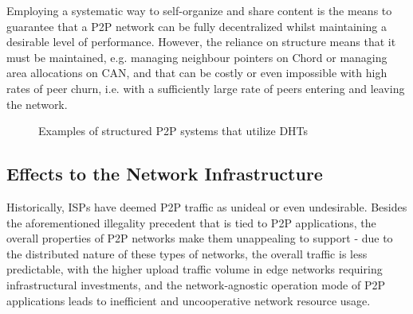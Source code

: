 \documentclass[
  oneside,
  11pt, a4paper,
  footinclude=true,
  headinclude=true,
  cleardoublepage=empty
]{scrbook}
\begin{document}
    Employing a systematic way to self-organize and share content is the means to guarantee that a P2P network can be fully decentralized whilst maintaining a desirable level of performance. However, the reliance on structure means that it must be maintained, e.g. managing neighbour pointers on Chord or managing area allocations on CAN, and that can be costly or even impossible with high rates of peer churn, i.e. with a sufficiently large rate of peers entering and leaving the network.
    
    \begin{figure}%
    \centering
    \qquad
    \caption{Examples of structured P2P systems that utilize DHTs}
    \label{fig:dht-usage}
    \end{figure}
    

	\subsection{Effects to the Network Infrastructure}
	
	
	Historically, ISPs have deemed P2P traffic as unideal or even undesirable. Besides the aforementioned illegality precedent that is tied to P2P applications, the overall properties of P2P networks make them unappealing to support - due to the distributed nature of these types of networks, the overall traffic is less predictable, with the higher upload traffic volume in edge networks requiring infrastructural investments, and the network-agnostic operation mode of P2P applications leads to inefficient and uncooperative network resource usage. 
	
\end{document}

